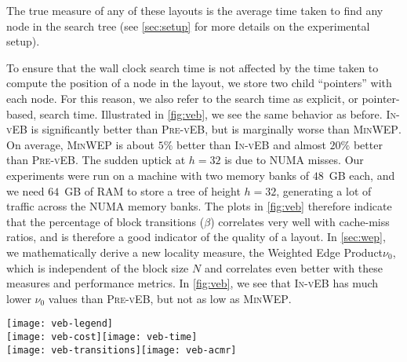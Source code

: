 \documentclass[10pt,conference,letterpaper]{IEEEtran}
\newcommand{\note}[1]{}
\newcommand{\comment}[1]{}
\newcommand{\node}{node\xspace}
\newcommand{\nodes}{nodes\xspace}
\newcommand{\pvl}{\textsc{Pre-vEB}\xspace}
\newcommand{\ivl}{\textsc{In-vEB}\xspace}
\newcommand{\WEP}{Weighted Edge Product\xspace}
\newcommand{\pwmean}[1][p]{\ensuremath{\nu_{#1}}\xspace}
\newcommand{\PB}{\ensuremath{\beta}\xspace}
\newcommand{\minwep}{\textsc{MinWEP}\xspace}
\newcommand{\csize}[1][]{\ensuremath{N}\xspace}
\begin{document}
\note{Point out linearity of \pwmean[0] for \minwep? Not sure how to work this in.}
The true measure of any of these layouts is the average time taken to find any \node in the search tree (see \autoref{sec:setup} for more details on the experimental setup).
\comment{To measure this, we repeat the following experiment $10$ million times for each layout: Choose a \node at random, and measure the time taken to search for it.
}
To ensure that the wall clock search time is not affected by the time taken to compute the position of a \node in the layout, we store two child ``pointers'' with each \node. For this reason, we also refer to the search time as explicit, or pointer-based, search time. Illustrated in \autoref{fig:veb}, we see the same behavior as before. \ivl is significantly better than \pvl, but is marginally worse than \minwep. On average, \minwep is about $5\%$ better than \ivl and almost $20\%$ better than \pvl. The sudden uptick at $h=32$ is due to NUMA misses. Our experiments were run on a machine with two memory banks of $48$~GB each, and we need $64$~GB of RAM to store a tree of height $h=32$, generating a lot of traffic across the NUMA memory banks.  The plots in \autoref{fig:veb} therefore indicate that the percentage of block transitions (\PB) correlates very well with cache-miss ratios, and is therefore a good indicator of the quality of a layout. In \autoref{sec:wep}, we mathematically derive a new locality measure, the \WEP \pwmean[0], which is independent of the block size \csize and correlates even better with these measures and performance metrics. In \autoref{fig:veb}, we see that \ivl has much lower \pwmean[0] values than \pvl, but not as low as \minwep.

\begin{figure*}[tp]
\centering \texttt{[image: veb-legend]}\\[1ex]\texttt{[image: veb-cost]}\hfill \texttt{[image: veb-time]}\\[2ex]\texttt{[image: veb-transitions]}\hfill \texttt{[image: veb-acmr]}\\\caption{
  Clockwise from top left:
  weighted edge length product \pwmean[0];
  wall clock search time;
  L1 and L2 cache miss rate;
  and block transitions for blocks of $N \in \{2, 5, 16\}$ \nodes
  as a function of tree height for several hierarchical layouts.
}\label{fig:veb}\end{figure*}
\end{document}
